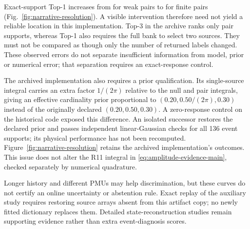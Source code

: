 Exact-support Top-1 increases from \GlobalWeakTopOne{} for weak pairs to
\GlobalFiniteTopOne{} for finite pairs (Fig.~\ref{fig:narrative-resolution}).
A visible intervention therefore need not yield a reliable location in
this implementation. Top-3 in the archive ranks only pair supports,
whereas Top-1 also requires the full bank to select two sources. They
must not be compared as though only the number of returned labels changed.
These observed errors do not separate insufficient information from model,
prior or numerical error; that separation requires an exact-response control.

The archived implementation also requires a prior qualification. Its
single-source integral carries an extra factor $1/(2\pi)$ relative to
the null and pair integrals, giving an effective cardinality prior
proportional to $(0.20,0.50/(2\pi),0.30)$ instead of the originally
declared $(0.20,0.50,0.30)$. A zero-response control on the historical
code exposed this difference. An isolated successor restores the declared
prior and passes independent linear-Gaussian checks for all 136 event
supports; its physical performance has not been recomputed. Figure~\ref{fig:narrative-resolution}
retains the archived implementation's outcomes. This issue does not alter
the R11 integral in \eqref{eq:amplitude-evidence-main}, checked separately
by numerical quadrature.

Longer history and different PMUs may help discrimination, but these
curves do not certify an online uncertainty or abstention rule. Exact
replay of the auxiliary study requires restoring source arrays absent
from this artifact copy; no newly fitted dictionary replaces them.
Detailed state-reconstruction studies remain supporting evidence rather
than extra event-diagnosis scores.
